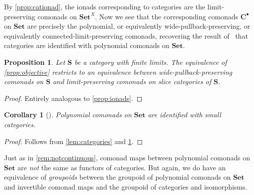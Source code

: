 \documentclass[11pt, oneside, article]{memoir}
\theoremstyle{plain}
\newtheorem{corollary}[theorem]{Corollary}
\newtheorem{proposition}[theorem]{Proposition}
\theoremstyle{definition}
\theoremstyle{remark}
\newenvironment{warning}
{\renewcommand\qedsymbol{$\lrcorner$}%
  \pushQED{\qed}\mywarning}
{\popQED\endmywarning}
\newcommand{\namedcat}[1]{\mathbf{#1}}
\newcommand{\cat}[1]{\mathbf{#1}}
\newcommand{\Set}{\namedcat{Set}}
\newcommand{\bC}{\cat{C}}
\newcommand{\bS}{\cat{S}}
\newcommand{\cbC}{\cattocmd{\bC}}
\newcommand{\cattocmd}[1]{{{#1}^\bullet}}
\begin{document}
By \cref{prop:cationad}, the ionads corresponding to categories are
the limit-preserving comonads on $\Set^X$. Now we see that the
corresponding comonads $\cbC$ on $\Set$ are precisely the polynomial,
or equivalently wide-pullback-preserving, or equivalently
connected-limit-preserving comonads, recovering the result
of~\cite{ahman-uustalu} that categories are identified with polynomial
comonads on $\Set$.

\begin{proposition}\label{prop:alex}
  Let $\bS$ be a category with finite limits. The equivalence of
  \cref{prop:objective} restricts to an equivalence between
  wide-pullback-preserving comonads on $\bS$ and limit-preserving
  comonads on slice categories of $\bS$.
\end{proposition}
\begin{proof}
  Entirely analogous to \cref{prop:ionads}.
\end{proof}

\begin{corollary}[{\cite{ahman-uustalu}}]\label{cor:au}
  Polynomial comonads on $\Set$ are identified with small categories.
\end{corollary}
\begin{proof}
  Follows from \cref{lem:categories} and \cref{prop:alex}.
\end{proof}

\begin{warning}\label{rem:notfunctors}
  Just as in \cref{rem:notcontinuous}, comonad maps between polynomial
  comonads on $\Set$ are \emph{not} the same as functors of
  categories. But again, we do have an equivalence of \emph{groupoids}
  between the groupoid of polynomial comonads on $\Set$ and invertible
  comonad maps and the groupoid of categories and isomorphisms.
\end{warning}
\end{document}
